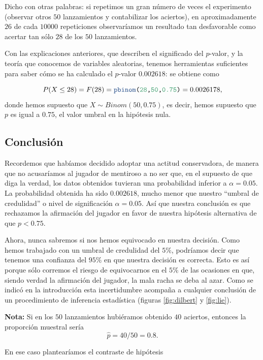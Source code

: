 \documentclass[
  notoc,
  nobib,
  degree=inf]{mnye}
\newcommand{\DecValTok}[1]{\textcolor[rgb]{0.00,0.00,0.81}{#1}}
\newcommand{\KeywordTok}[1]{\textcolor[rgb]{0.13,0.29,0.53}{\textbf{#1}}}
\newcommand{\NormalTok}[1]{#1}
\renewcommand{\DecValTok}[1]{\textcolor[RGB]{64, 160, 112}{\texttt{#1}}}
\renewcommand{\KeywordTok}[1]{\textcolor[rgb]{0.13,0.29,0.53}{\texttt{#1}}}
\renewcommand{\NormalTok}[1]{\texttt{#1}}
\begin{document}
Dicho con otras palabras: si repetimos un gran número de veces el experimento (observar otros \(50\) lanzamientos y contabilizar los aciertos), en aproximadamente \(26\) de cada \(10000\) repeticiones observaríamos un resultado tan desfavorable como acertar tan sólo \(28\) de los \(50\) lanzamientos.

Con las explicaciones anteriores, que describen el significado del \(p\)-valor, y la teoría que conocemos de variables aleatorias, tenemos herramientas suficientes para saber cómo se ha calculado el \(p\)-valor \(0.002618\): se obtiene como

\[
    P(X\le 28) = F(28) = \KeywordTok{pbinom}\NormalTok{(}\DecValTok{28}\NormalTok{,}\DecValTok{50}\NormalTok{,}\DecValTok{0.75}\NormalTok{)} =0.0026178,
\]
donde hemos supuesto que \(X\sim Binom(50,0.75)\), es decir, hemos supuesto que \(p\) es igual a \(0.75\), el valor umbral en la hipótesis nula.

\hypertarget{conclusiuxf3n}{%
\subsection{Conclusión}\label{conclusiuxf3n}}

Recordemos que habíamos decidido adoptar una actitud conservadora, de manera que no acusaríamos al jugador de mentiroso a no ser que, en el supuesto de que diga la verdad, los datos obtenidos tuvieran una probabilidad inferior a \(\alpha=0.05\). La probabilidad obtenida ha sido \(0.002618\), mucho menor que nuestro ``umbral de credulidad'' o nivel de significación \(\alpha=0.05\). Así que nuestra conclusión es que rechazamos la afirmación del jugador en favor de nuestra hipótesis alternativa de que \(p<0.75\).

Ahora, nunca sabremos si nos hemos equivocado en nuestra decisión. Como hemos trabajado con un umbral de credulidad del \(5\%\), podríamos decir que tenemos una confianza del \(95\%\) en que nuestra decisión es correcta. Esto es así porque sólo corremos el riesgo de equivocarnos en el \(5\%\) de las ocasiones en que, siendo verdad la afirmación del jugador, la mala racha se deba al azar. Como se indicó en la introducción esta incertidumbre acompaña a cualquier conclusión de un procedimiento de inferencia estadística (figuras \ref{fig:dilbert} y \ref{fig:lie}).

\textbf{Nota:} Si en los \(50\) lanzamientos hubiéramos obtenido \(40\) aciertos, entonces la proporción muestral sería
\[\hat p = 40/50=0.8.\]

En ese caso plantearíamos el contraste de hipótesis
\end{document}
